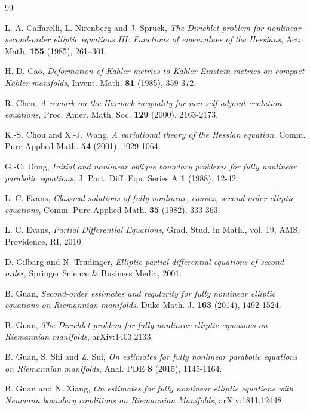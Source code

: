 \documentclass[12pt]{amsart}
\theoremstyle{definition}
\theoremstyle{remark}
\numberwithin{equation}{section}
\begin{document}
\begin{thebibliography}{99}
		
	L. A. Caffarelli, L. Nirenberg and J. Spruck, 
	{\em The Dirichlet problem for nonlinear second-order elliptic equations III: Functions of eigenvalues of the Hessians},
	{Acta Math.}  {\bf 155} (1985), 261--301.
	
	H.-D. Cao, 
	{\em Deformation of K\"ahler metrics to K\"ahler-Einstein metrics on compact K\"ahler manifolds},
	{Invent. Math.}  {\bf 81} (1985), 359-372.
	
	R. Chen,
	{\em A remark on the Harnack inequality for non-self-adjoint evolution equations},
	{Proc. Amer. Math. Soc.} {\bf 129} (2000), 2163-2173.
	
	K.-S. Chou and X.-J. Wang,
	{\em A variational theory of the Hessian equation},
	{Comm. Pure Applied Math.} {\bf 54} (2001), 1029-1064.
	
	G.-C. Dong,
	{\em Initial and nonlinear oblique boundary problems for fully nonlinear parabolic equations},
	{J. Part. Diff. Equ. Series A} {\bf 1} (1988), 12-42.
	
	L. C. Evans, 
	{\em Classical solutions of fully nonlinear, convex, second-order elliptic equations},
	{Comm. Pure Applied Math.}  {\bf 35} (1982), 333-363.
	
	L. C. Evans, 
	{\em Partial Differential Equations},
	Grad. Stud. in Math., vol. 19, AMS, Providence, RI, 2010.
	
	D. Gilbarg and N. Trudinger,
	{\em Elliptic partial differential equations of second-order}, 
	Springer Science $\&$ Business Media, 2001.
	
	B. Guan, 
	{\em Second-order estimates and regularity for fully nonlinear elliptic equations on Riemannian manifolds},
	{Duke Math. J.}  {\bf 163} (2014), 1492-1524. 
	
	B. Guan,
	{\em The Dirichlet problem for fully nonlinear elliptic equations on Riemannian manifolds},
	arXiv:1403.2133.
	
	B. Guan, S. Shi and Z. Sui,
	{\em On estimates for fully nonlinear parabolic equations on Riemannian manifolds},
	{Anal. PDE} {\bf 8} (2015), 1145-1164.
	
	B. Guan and N. Xiang,
	{\em On estimates for fully nonlinear elliptic equations with Neumann boundary conditions on Riemannian Manifolds}, arXiv:1811.12448
	

\end{thebibliography}
\end{document}
